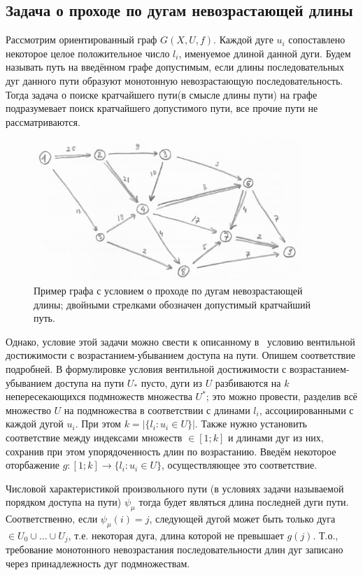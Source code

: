 	\subsection{Задача о проходе по дугам невозрастающей длины}
	
	Рассмотрим ориентированный граф $G(X,U,f)$. Каждой дуге $u_i$ сопоставлено некоторое целое положительное число $l_i$, именуемое длиной данной дуги. Будем называть путь на введённом графе допустимым, если длины последовательных дуг данного пути образуют монотонную невозрастающую последовательность. Тогда задача о поиске кратчайшего пути(в смысле длины пути) на графе подразумевает поиск кратчайшего допустимого пути, все прочие пути не рассматриваются. 
	
	\begin{figure}
		\centering
		\includegraphics[width=0.9\textwidth]{img/1.png}
		\caption{Пример графа с условием о проходе по дугам невозрастающей длины; двойными стрелками обозначен допустимый кратчайший путь.}
		\label{fig:pic_1}
	\end{figure}
	
	Однако, условие этой задачи можно свести к описанному в~\autocite{Mono} условию вентильной достижимости с возрастанием-убыванием доступа на пути. Опишем соответствие подробней. В формулировке условия вентильной достижимости с возрастанием-убыванием доступа на пути $U_*$ пусто, дуги из $U$ разбиваются на $k$ непересекающихся подмножеств множества $U^*$; это можно провести, разделив всё множество $U$ на подмножества в соответствии с длинами $l_i$, ассоциированными с каждой дугой $u_i$. При этом $k = |\{ l_i : u_i \in U\}|$. Также нужно установить соответствие между индексами множеств $\in [1; k]$ и длинами дуг из них, сохранив при этом упорядоченность длин по возрастанию. Введём некоторое оторбажение $g:[1; k]\to \{ l_i : u_i \in U\}$, осуществляющее это соответствие. 
	
	Числовой характеристикой произвольного пути (в условиях задачи называемой порядком доступа на пути)
	$\psi_\mu$ тогда будет являться длина последней дуги пути. Соответственно, если $\psi_\mu(i) = j$, следующей дугой может быть только дуга $\in U_0 \cup ... \cup U_j$, т.е. некоторая дуга, длина которой не превышает $g(j)$. Т.о., требование монотонного невозрастания последовательности длин дуг записано через принадлежность дуг подмножествам. 
	
